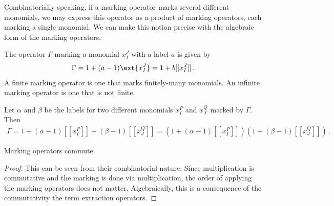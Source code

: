 Combinatorially speaking, if a marking operator marks several different monomials, we may express this operator as a product of marking operators, each marking a single monomial. We can make this notion precise with the algebraic form of the marking operators.
\begin{definition} The operator $\Gamma$ marking a monomial $x_I^J$ with a label $a$ is given by
\begin{align}
	\Gamma = 1  +(a-1)\ext{x_I^J} = 1 + b[[x_I^J]]\,.
\end{align}
A finite marking operator is one that marks finitely-many monomials. An infinite marking operator is one that is not finite.
\end{definition}
\begin{lemma} Let $\alpha$ and $\beta$ be the labels for two different monomials $x_I^P$ and $x_J^Q$ marked by $\Gamma$. Then
\begin{align}
	\Gamma = 1 + (\alpha-1)[[x_I^P]]+(\beta-1)[[x_J^Q]] = (1+ (\alpha-1)[[x_I^P]])(1+ (\beta-1)[[x_J^Q]])\,.
\end{align}
\end{lemma}
\begin{corollary} Marking operators commute.
\end{corollary}
\begin{proof} This can be seen from their combinatorial nature. Since multiplication is commutative and the marking is done via multiplication, the order of applying the marking operators does not matter. Algebraically, this is a consequence of the commutativity the term extraction operators.
\end{proof}

